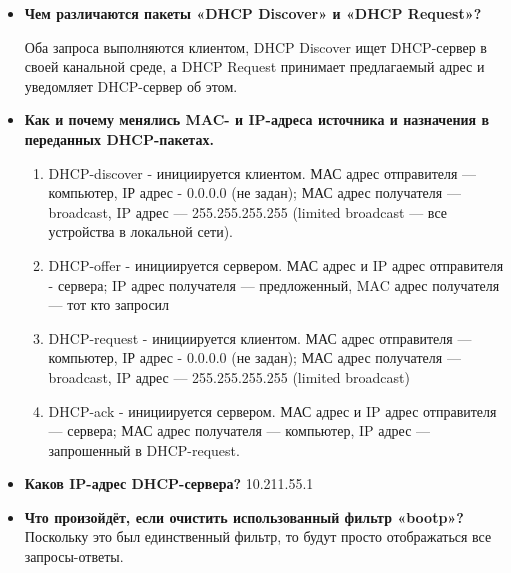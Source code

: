 \documentclass[12pt,onecolumn]{article}
\begin{document}
\begin{itemize}
    \item {
        \textbf{Чем различаются пакеты «DHCP Discover» и «DHCP Request»?}

        Оба запроса выполняются клиентом, DHCP Discover ищет DHCP-сервер в своей
        канальной среде, а DHCP Request принимает предлагаемый адрес и уведомляет
        DHCP-сервер об этом.
    }
    \item {
        \textbf{Как и почему менялись MAC- и IP-адреса источника и назначения в переданных DHCP-пакетах.}

        \begin{enumerate}
            \item DHCP-discover - инициируется клиентом. МАС адрес отправителя —
            компьютер, IР адрес - 0.0.0.0 (не задан); МАС адрес получателя — broadcast,
            IP адрес — 255.255.255.255 (limited broadcast — все устройства в локальной
            сети).
            \item DHCP-offer - инициируется сервером. МАС адрес и IP адрес отправителя -
            сервера; IP адрес получателя — предложенный, MAC адрес получателя — тот кто запросил
            \item DHCP-request - инициируется клиентом. МАС адрес отправителя —
            компьютер, IР адрес - 0.0.0.0 (не задан); МАС адрес получателя — broadcast,
            IP адрес — 255.255.255.255 (limited broadcast)
            \item DHCP-ack - инициируется сервером. МАС адрес и IP адрес отправителя —
            сервера; МАС адрес получателя — компьютер, IP адрес — запрошенный в
            DHCP-request.
        \end{enumerate}
    }
    \item {
        \textbf{Каков IP-адрес DHCP-сервера?}
        10.211.55.1
    }
    \item {
        \textbf{Что произойдёт, если очистить использованный фильтр «bootp»?} Поскольку это был единственный фильтр, то будут просто отображаться все
        запросы-ответы.
    }
\end{itemize}
\end{document}
